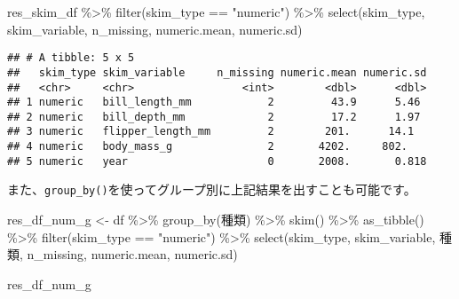 \documentclass[
  xelatex,ja=standard, b5paper]{bxjsbook}
\newenvironment{Shaded}{\begin{snugshade}}{\end{snugshade}}
\newcommand{\FunctionTok}[1]{\textcolor[rgb]{0.00,0.00,0.00}{#1}}
\newcommand{\NormalTok}[1]{#1}
\newcommand{\OtherTok}[1]{\textcolor[rgb]{0.56,0.35,0.01}{#1}}
\newcommand{\SpecialCharTok}[1]{\textcolor[rgb]{0.00,0.00,0.00}{#1}}
\newcommand{\StringTok}[1]{\textcolor[rgb]{0.31,0.60,0.02}{#1}}
\begin{document}
\begin{Shaded}
\begin{Highlighting}[]
\NormalTok{res\_skim\_df }\SpecialCharTok{\%\textgreater{}\%} 
  \FunctionTok{filter}\NormalTok{(skim\_type  }\SpecialCharTok{==} \StringTok{"numeric"}\NormalTok{) }\SpecialCharTok{\%\textgreater{}\%} 
  \FunctionTok{select}\NormalTok{(skim\_type, skim\_variable,}
\NormalTok{         n\_missing, numeric.mean, numeric.sd)}
\end{Highlighting}
\end{Shaded}

\begin{verbatim}
## # A tibble: 5 x 5
##   skim_type skim_variable     n_missing numeric.mean numeric.sd
##   <chr>     <chr>                 <int>        <dbl>      <dbl>
## 1 numeric   bill_length_mm            2         43.9      5.46 
## 2 numeric   bill_depth_mm             2         17.2      1.97 
## 3 numeric   flipper_length_mm         2        201.      14.1  
## 4 numeric   body_mass_g               2       4202.     802.   
## 5 numeric   year                      0       2008.       0.818
\end{verbatim}

また、\texttt{group\_by()}を使ってグループ別に上記結果を出すことも可能です。

\begin{Shaded}
\begin{Highlighting}[]
\NormalTok{res\_df\_num\_g }\OtherTok{\textless{}{-}} 
\NormalTok{df }\SpecialCharTok{\%\textgreater{}\%} 
  \FunctionTok{group\_by}\NormalTok{(種類) }\SpecialCharTok{\%\textgreater{}\%} 
  \FunctionTok{skim}\NormalTok{() }\SpecialCharTok{\%\textgreater{}\%} 
  \FunctionTok{as\_tibble}\NormalTok{() }\SpecialCharTok{\%\textgreater{}\%} 
  \FunctionTok{filter}\NormalTok{(skim\_type  }\SpecialCharTok{==} \StringTok{"numeric"}\NormalTok{) }\SpecialCharTok{\%\textgreater{}\%} 
  \FunctionTok{select}\NormalTok{(skim\_type, skim\_variable, 種類,}
\NormalTok{         n\_missing, numeric.mean, numeric.sd)}

\NormalTok{res\_df\_num\_g}
\end{Highlighting}
\end{Shaded}
\end{document}
